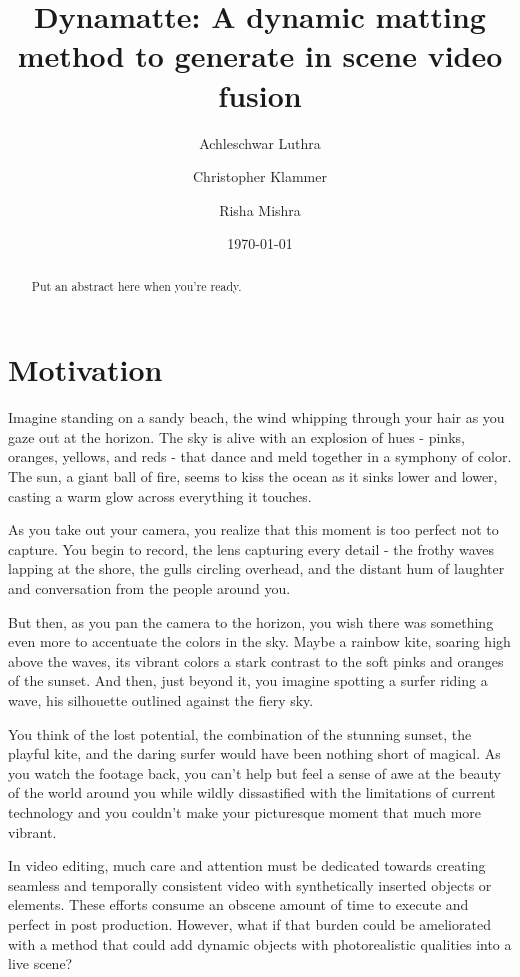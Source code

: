 \documentclass{amsart}
\title{Dynamatte: A dynamic matting method to generate in scene video fusion}
\author{Achleschwar Luthra}
\author{Christopher Klammer}
\author{Risha Mishra}
\date{\today}
\begin{document}
\begin{abstract}
 Put an abstract here when you're ready.
\end{abstract}

\maketitle

\tableofcontents

\section{Motivation}
Imagine standing on a sandy beach, the wind whipping through your hair as you gaze out at the horizon. The sky is alive with an explosion of hues - pinks, oranges, yellows, and reds - that dance and meld together in a symphony of color. The sun, a giant ball of fire, seems to kiss the ocean as it sinks lower and lower, casting a warm glow across everything it touches.

As you take out your camera, you realize that this moment is too perfect not to capture. You begin to record, the lens capturing every detail - the frothy waves lapping at the shore, the gulls circling overhead, and the distant hum of laughter and conversation from the people around you.

But then, as you pan the camera to the horizon, you wish there was something even more to accentuate the colors in the sky. Maybe a rainbow kite, soaring high above the waves, its vibrant colors a stark contrast to the soft pinks and oranges of the sunset. And then, just beyond it, you imagine spotting a surfer riding a wave, his silhouette outlined against the fiery sky.

You think of the lost potential, the combination of the stunning sunset, the playful kite, and the daring surfer would have been nothing short of magical. As you watch the footage back, you can't help but feel a sense of awe at the beauty of the world around you while wildly dissastified with the limitations of current technology and you couldn't make your picturesque moment that much more vibrant.


In video editing, much care and attention must be dedicated towards creating seamless and temporally consistent video with synthetically inserted objects or elements. These efforts consume an obscene amount of time to execute and perfect in post production. However, what if that burden could be ameliorated with a method that could add dynamic objects with photorealistic qualities into a live scene? 
\end{document}
